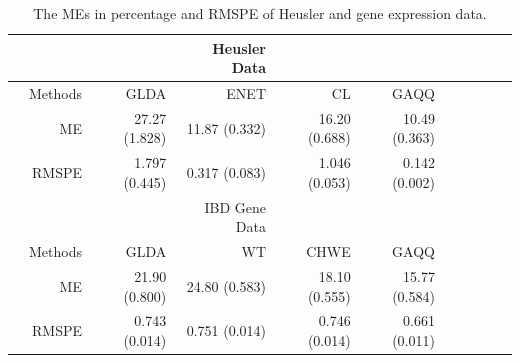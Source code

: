 \documentclass[12pt]{article}
\begin{document}
\begin{table}[h]
\small
\begin{center}
\caption{The MEs in percentage and RMSPE of Heusler and gene expression data.} \label{table:realdata}
\begin{tabular}{rrrrrrrrrrr}
\hline \hline
&&& Heusler Data \\
\hline
&Methods    &GLDA           &ENET               &CL             &GAQQ    \\
&ME         &27.27 (1.828)  &11.87 (0.332)      &16.20 (0.688)  &10.49 (0.363) \\
&RMSPE      &1.797 (0.445)  &0.317 (0.083)      &1.046 (0.053)  &0.142 (0.002) \\
\hline
&&& IBD Gene Data \\
\hline
&Methods    &GLDA           &WT               &CHWE           &GAQQ    \\
&ME         &21.90 (0.800)  &24.80 (0.583)    &18.10 (0.555)  &15.77 (0.584) \\
&RMSPE      &0.743 (0.014)  &0.751 (0.014)    &0.746 (0.014)  &0.661 (0.011) \\
\hline \hline
\end{tabular}
\end{center}
\end{table}
\end{document}
